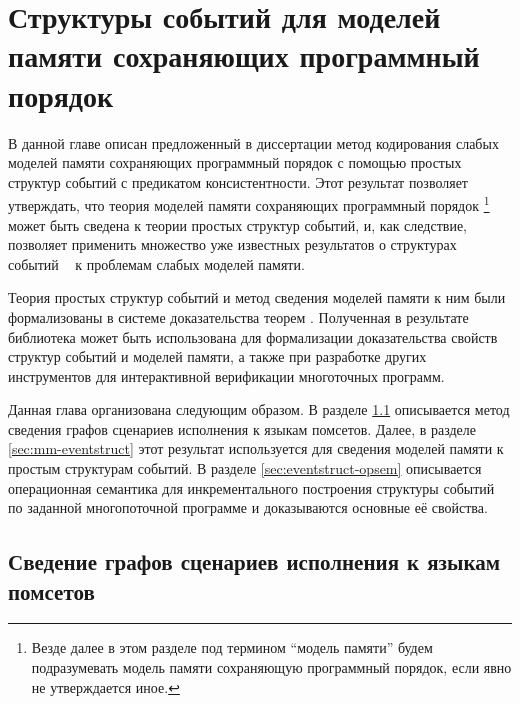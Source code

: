\chapter{Структуры событий для моделей памяти сохраняющих программный порядок}
\label{ch:porf-evenstruct}

В данной главе описан предложенный в диссертации метод 
кодирования слабых моделей памяти сохраняющих программный порядок 
с помощью простых структур событий с предикатом консистентности. 
Этот результат позволяет утверждать, что теория  
моделей памяти сохраняющих программный порядок%
\footnote{Везде далее в этом разделе 
под термином ``модель памяти'' будем подразумевать 
модель памяти сохраняющую программный порядок, 
если явно не утверждается иное.} 
может быть сведена к теории простых структур событий, 
и, как следствие, позволяет применить множество 
уже известных результатов о структурах событий%
~\cite{Winskel:86,Vaandrager:TCS1991,Sassone:MFCS1993,Nielsen:REX93,Winskel-TCS:09}
к проблемам слабых моделей памяти.

Теория простых структур событий и метод сведения 
моделей памяти к ним были формализованы в системе 
доказательства теорем \coq. 
Полученная в результате библиотека может быть использована 
для формализации доказательства свойств структур событий 
и моделей памяти, а также при разработке других
инструментов для интерактивной верификации многоточных программ.

Данная глава организована следующим образом. 
В разделе \cref{sec:pomset-graphs} описывается метод 
сведения графов сценариев исполнения к языкам помсетов. 
Далее, в разделе \cref{sec:mm-eventstruct} этот результат 
используется для сведения моделей памяти к простым структурам событий. 
В разделе \cref{sec:eventstruct-opsem} описывается 
операционная семантика для инкрементального построения 
структуры событий по заданной многопоточной программе 
и доказываются основные её свойства. 

\section{Сведение графов сценариев исполнения к языкам помсетов}
\label{sec:pomset-graphs}

